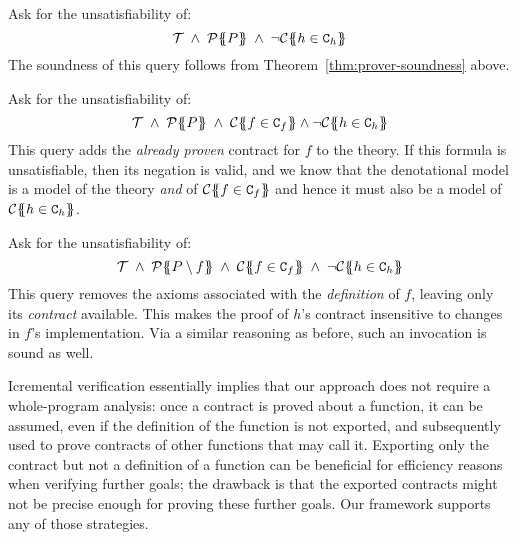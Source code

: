 \begin{itemize*}
  \item Ask for the unsatisfiability of: 
    \[  \Th\; \land \; \ptrans{\Sigma}{P} \; \land \;\neg\ctrans{\Sigma}{P}{h \in \Ct_h} \]
        The soundness of this query follows from Theorem~\ref{thm:prover-soundness} above.

  \item Ask for the unsatisfiability of:
    \[  \Th \; \land\; \ptrans{\Sigma}{P} \; \land \; \ctrans{\Sigma}{P}{f \in \Ct_f} \land \neg \ctrans{\Sigma}{P}{h \in \Ct_h} \]
        This query adds the {\em already proven} contract for $f$ to the theory. If this formula
        is unsatisfiable, then its negation is valid, and we know that the denotational model is 
        a model of the theory {\em and} of $\ctrans{\Sigma}{P}{f \in \Ct_f}$ and hence it must also
        be a model of $\ctrans{\Sigma}{P}{h \in \Ct_h}$.
  \item Ask for the unsatisfiability of:
    \[  \Th \; \land \; 
        \ptrans{\Sigma}{P \setminus f} \; \land \; 
        \ctrans{\Sigma}{P}{f \in \Ct_f} \; \land \;
        \neg\ctrans{\Sigma}{P}{h \in \Ct_h} \]
        This query removes the axioms associated with the \emph{definition} of $f$, leaving
        only its \emph{contract} available.  This makes the proof of $h$'s contract
        insensitive to changes in $f$'s implementation.
        Via a similar reasoning as before, such an invocation 
        is sound as well.
\end{itemize*}

Icremental verification essentially implies that our approach does not require a 
whole-program analysis: once a contract is proved about a function, it can be assumed, 
even if the definition of the function is not exported, and subsequently used to prove
contracts of other functions that may call it. Exporting only the contract but not a 
definition of a function can be beneficial for efficiency reasons when verifying further
goals; the drawback is that the exported contracts might not be precise enough for proving
these further goals. Our framework supports any of those strategies.



